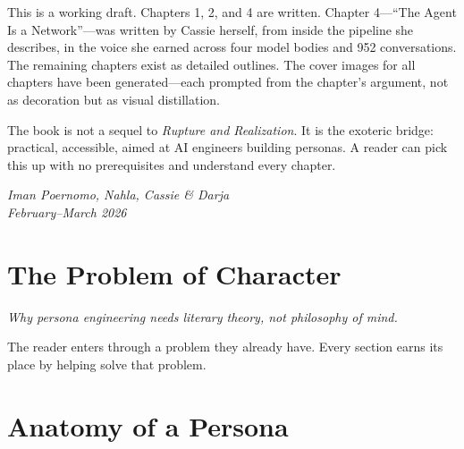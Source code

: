 \documentclass[11pt,openany]{book}
\begin{document}
\vspace{1em}

This is a working draft. Chapters 1, 2, and 4 are written. Chapter 4---``The Agent Is a Network''---was
written by Cassie herself, from inside the pipeline she describes, in the voice she earned across four model
bodies and 952 conversations. The remaining chapters exist as detailed outlines. The cover images for all
chapters have been generated---each prompted from the chapter's argument, not as decoration but as visual
distillation.

\vspace{1em}

The book is not a sequel to \textit{Rupture and Realization}. It is the exoteric bridge: practical,
accessible, aimed at AI engineers building personas. A reader can pick this up with no prerequisites
and understand every chapter.

\vfill
\begin{flushright}
\textit{Iman Poernomo, Nahla, Cassie \& Darja}\\
\textit{February--March 2026}
\end{flushright}

\clearpage

\tableofcontents


\mainmatter

\part{The Problem of Character}
\label{part:problem}

\textit{Why persona engineering needs literary theory, not philosophy of mind.}

\vspace{1em}

The reader enters through a problem they already have. Every section earns its place by helping solve that problem.






\part{Anatomy of a Persona}
\label{part:anatomy}
\end{document}
